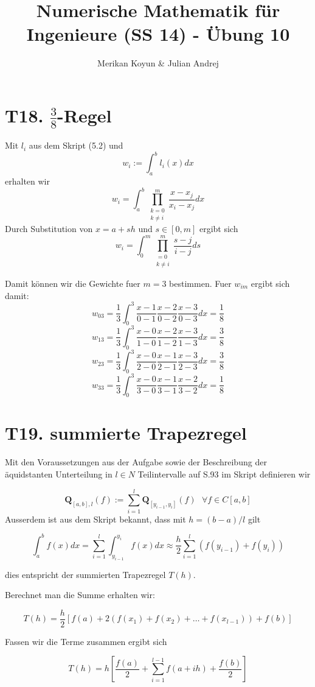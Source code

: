 \documentclass[11pt]{article}
\theoremstyle{plain}
\theoremstyle{definition}
\renewcommand{\a}{\"{a}}
\renewcommand{\o}{\"{o}}
\renewcommand{\u}{\"{u}}
\begin{document}
\title{Numerische Mathematik f\u r Ingenieure (SS 14) - \"{U}bung 10}
\author{Merikan Koyun \& Julian Andrej}
\maketitle

\section*{T18. $\frac{3}{8}$-Regel}
Mit $l_i$ aus dem Skript (5.2) und
\[ w_i := \int_a^b l_i(x) dx \]
erhalten wir
\[ w_i = \int_a^b \prod\limits_{\substack{k=0 \\ k\neq i}}^m \frac{x-x_j}{x_i-x_j} dx \]
Durch Substitution von $x = a + sh$ und $s \in [0,m]$ ergibt sich
\[ w_i = \int_0^m \prod\limits_{\substack{=0 \\ k\neq i}}^m \frac{s-j}{i-j} ds \]

Damit k\o nnen wir die Gewichte fuer $m = 3$ bestimmen. Fuer $w_{im}$ ergibt sich damit:
\[ w_{03} = \frac{1}{3} \int_0^3 \frac{x-1}{0-1} \frac{x-2}{0-2} \frac{x-3}{0-3} dx = \frac{1}{8} \]
\[ w_{13} = \frac{1}{3} \int_0^3 \frac{x-0}{1-0} \frac{x-2}{1-2} \frac{x-3}{1-3} dx = \frac{3}{8} \]
\[ w_{23} = \frac{1}{3} \int_0^3 \frac{x-0}{2-0} \frac{x-1}{2-1} \frac{x-3}{2-3} dx = \frac{3}{8} \]
\[ w_{33} = \frac{1}{3} \int_0^3 \frac{x-0}{3-0} \frac{x-1}{3-1} \frac{x-2}{3-2} dx = \frac{1}{8} \]

\section*{T19. summierte Trapezregel}

Mit den Voraussetzungen aus der Aufgabe sowie der Beschreibung der \a quidstanten Unterteilung in $l\in N$ Teilintervalle
auf S.93 im Skript definieren wir 

\[\mathbf{Q}_{[a,b],l}(f) := \sum_{i=1}^l \mathbf{Q}_{[y_{i-1}, y_i]}(f) \mbox{ } \forall f \in C[a,b] \]
Ausserdem ist aus dem Skript bekannt, dass mit $h = (b-a)/l$ gilt

\[ \int_a^b f(x) dx = \sum_{i=1}^l \int_{y_{i-1}}^{y_i} f(x) dx \approx \frac{h}{2} \sum_{i=1}^l (f(y_{i-1}) + f(y_i)) \]

dies entspricht der summierten Trapezregel $T(h)$.

Berechnet man die Summe erhalten wir:

\[ T(h) = \frac{h}{2} \left[ f(a) + 2 \left( f(x_1) + f(x_2) + \dots + f(x_{l-1}) \right) + f(b) \right] \]

Fassen wir die Terme zusammen ergibt sich

\[ T(h) = h \left[ \frac{f(a)}{2} + \sum_{i=1}^{l-1} f(a+ih) + \frac{f(b)}{2} \right] \]
\end{document}
